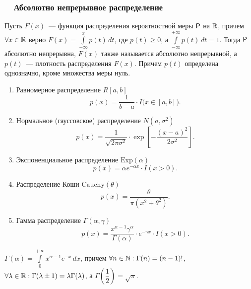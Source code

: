 \subsubsection*{~~Абсолютно непрерывное распределение}
\begin{definition}
	Пусть $F(x)$~--- функция распределения вероятностной меры $\P$ на $\R$, причем $\forall x \in \R$ верно $F(x) = \int\limits_{-\infty}^{x} p(t) \, d t$, где  $p(t) \geqslant 0$, а $\int\limits_{-\infty}^{+\infty} p(t) \, d t = 1$. Тогда $\P$ абсолютно непрерывна, $F(x)$ также называется абсолютно непрерывной, а $p(t)$~--- плотность распределения $F(x)$. Причем $p(t)$ определена однозначно, кроме множества меры нуль.
\end{definition}
\begin{enumerate}
	\item{ Равномерное распределение $R[a,b]$ 
		$$p(x) = \frac{1}{b -a } \cdot I \big( x \in [a,b] \big). $$}
	\item{Нормальное (гауссовское) распределение $N(a, \sigma^2)$
		$$p(x) = \frac{1}{\sqrt{2 \pi \sigma^2}} \cdot \exp \left[ -\frac{(x - a)^2}{2 \sigma^2} \right]. $$}
	\item{Экспоненциальное распределение $\text{Exp}(\alpha)$
	$$p(x) = \alpha e^{-\alpha x} \cdot I(x > 0).$$}
	\item{Распределение Коши $\text{Cauchy}(\theta)$
		$$p(x) = \frac{\theta}{\pi \left(x^2 + \theta^2 \right)}.$$}
	\item{ Гамма распределение $\Gamma(\alpha, \gamma)$
		$$p(x) = \frac{x^{\alpha - 1} \gamma^{\alpha}}{\Gamma(\alpha)} \cdot e^{-\gamma x} \cdot I(x > 0).$$}
\end{enumerate}
\begin{definition}
	$\Gamma(\alpha) = \int\limits_0^{+\infty} x^{\alpha - 1} e^{-x} \, d x$, причем $\forall n \in \N : \Gamma(n) = (n - 1)!$, $\forall \lambda \in \R: \Gamma(\lambda \pm 1) = \lambda \Gamma(\lambda)$, а $\Gamma\left(\dfrac{1}{2}\right) = \sqrt{\pi}$.
\end{definition}

